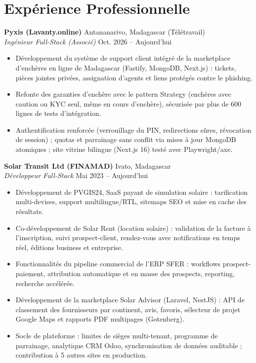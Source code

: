 \documentclass[10pt,a4paper]{article}
\newcommand{\role}[4]{%
  \vspace{3pt}%
  \textbf{#1} \hfill #2\\[-0.1em]
  \textit{#3} \hfill #4\par\vspace{1pt}}
\begin{document}
\section*{Expérience Professionnelle}

\role{Pyxis (Lavanty.online)}{Antananarivo, Madagascar (Télétravail)}{Ingénieur Full-Stack (Associé)}{Oct. 2026 -- Aujourd'hui}
\begin{itemize}
  \item Développement du système de support client intégré de la marketplace d'enchères en ligne de Madagascar (Fastify, MongoDB, Next.js) : tickets, pièces jointes privées, assignation d'agents et liens protégés contre le phishing.
  \item Refonte des garanties d'enchère avec le pattern Strategy (enchères avec caution ou KYC seul, même en cours d'enchère), sécurisée par plus de 600 lignes de tests d'intégration.
  \item Authentification renforcée (verrouillage du PIN, redirections sûres, révocation de session) ; quotas et parrainage sans conflit via mises à jour MongoDB atomiques ; site vitrine bilingue (Next.js 16) testé avec Playwright/axe.
\end{itemize}

\role{Solar Transit Ltd (FINAMAD)}{Ivato, Madagascar}{Développeur Full-Stack}{Mai 2023 -- Aujourd'hui}
\begin{itemize}
  \item Développement de PVGIS24, SaaS payant de simulation solaire : tarification multi-devises, support multilingue/RTL, sitemaps SEO et mise en cache des résultats.
  \item Co-développement de Solar Rent (location solaire) : validation de la facture à l'inscription, suivi prospect-client, rendez-vous avec notifications en temps réel, éditions business et entreprise.
  \item Fonctionnalités du pipeline commercial de l'ERP SFER : workflows prospect-paiement, attribution automatique et en masse des prospects, reporting, recherche accélérée.
  \item Développement de la marketplace Solar Advisor (Laravel, NestJS) : API de classement des fournisseurs par continent, avis, favoris, sélecteur de projet Google Maps et rapports PDF multipages (Gotenberg).
  \item Socle de plateforme : limites de sièges multi-tenant, programme de parrainage, analytique CRM Odoo, synchronisation de données auditable ; contribution à 5 autres sites en production.
\end{itemize}
\end{document}
